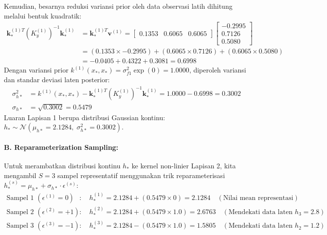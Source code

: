 \documentclass[11pt,a4paper]{article}
\begin{document}
Kemudian, besarnya reduksi variansi prior oleh data observasi latih dihitung melalui bentuk kuadratik:
\begin{align}
\mathbf{k}_*^{(1)T} (K_y^{(1)})^{-1} \mathbf{k}_*^{(1)} &= \mathbf{k}_*^{(1)T} \mathbf{v}^{(1)} = \begin{bmatrix} 0.1353 & 0.6065 & 0.6065 \end{bmatrix} \begin{bmatrix} -0.2995 \\ 0.7126 \\ 0.5080 \end{bmatrix} \nonumber \\
&= (0.1353 \times -0.2995) + (0.6065 \times 0.7126) + (0.6065 \times 0.5080) \nonumber \\
&= -0.0405 + 0.4322 + 0.3081 = \mathbf{0.6998}
\end{align}
Dengan variansi prior $k^{(1)}(x_*, x_*) = \sigma_{f1}^2 \exp(0) = 1.0000$, diperoleh variansi dan standar deviasi laten posterior:
\begin{align}
\sigma_{h*}^2 &= k^{(1)}(x_*, x_*) - \mathbf{k}_*^{(1)T} (K_y^{(1)})^{-1} \mathbf{k}_*^{(1)} = 1.0000 - 0.6998 = \mathbf{0.3002} \\
\sigma_{h*} &= \sqrt{0.3002} = \mathbf{0.5479}
\end{align}
Luaran Lapisan 1 berupa distribusi Gaussian kontinu: $h_* \sim \mathcal{N}\left(\mu_{h*} = 2.1284, \; \sigma_{h*}^2 = 0.3002\right)$.

\paragraph{B. Reparameterization Sampling:}
Untuk merambatkan distribusi kontinu $h_*$ ke kernel non-linier Lapisan 2, kita mengambil $S = 3$ sampel representatif menggunakan trik reparameterisasi $h_*^{(s)} = \mu_{h*} + \sigma_{h*} \cdot \epsilon^{(s)}$:
\begin{align}
\text{Sampel 1 } (\epsilon^{(1)} = 0)   &: \quad h_*^{(1)} = 2.1284 + (0.5479 \times 0) = \mathbf{2.1284} \quad (\text{Nilai mean representasi}) \\
\text{Sampel 2 } (\epsilon^{(2)} = +1)  &: \quad h_*^{(2)} = 2.1284 + (0.5479 \times 1.0) = \mathbf{2.6763} \quad (\text{Mendekati data laten } h_3 = 2.8) \\
\text{Sampel 3 } (\epsilon^{(3)} = -1)  &: \quad h_*^{(3)} = 2.1284 - (0.5479 \times 1.0) = \mathbf{1.5805} \quad (\text{Mendekati data laten } h_2 = 1.2)
\end{align}
\end{document}
